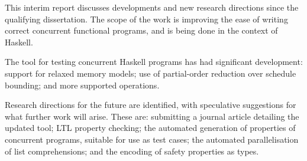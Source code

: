 This interim report discusses developments and new research directions
since the qualifying dissertation. The scope of the work is improving
the ease of writing correct concurrent functional programs, and is
being done in the context of Haskell.

The \dejafu{} tool for testing concurrent Haskell programs has had
significant development: support for relaxed memory models; use of
partial-order reduction over schedule bounding; and more supported
operations.

Research directions for the future are identified, with speculative
suggestions for what further work will arise. These are: submitting a
journal article detailing the updated \dejafu{} tool; LTL property
checking; the automated generation of properties of concurrent
programs, suitable for use as test cases; the automated
parallelisation of list comprehensions; and the encoding of safety
properties as types.
